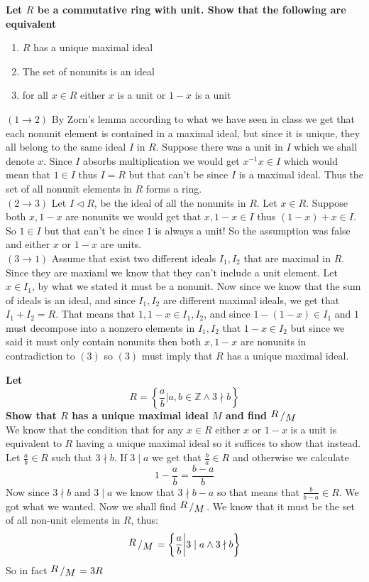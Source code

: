 \documentclass{article}
\theoremstyle{plain}
\DeclareMathOperator{\idealin}{\triangleleft}
\newcommand{\Z}{\mathbb{Z}}
\newcommand{\bigslant}[2]
{{\raisebox{.2em}{$#1$}\left/\raisebox{-.2em}{$#2$}\right.}}
\begin{document}
	\textbf{Let $R$ be a commutative ring with unit. Show that the following 
	are equivalent}
    \begin{enumerate}
        \item $R$ has a unique maximal ideal
        \item The set of nonunits is an ideal
        \item for all $x\in R$ either $x$ is a unit or $1-x$ is a 
        unit
    \end{enumerate}
    $(1\to 2)$ By Zorn's lemma according to what we have seen in
    class we get that each nonunit element is contained in a maximal
    ideal, but since it is unique, they all belong to the same ideal
    $I$ in $R$. Suppose there was a unit in $I$ which we shall
    denote $x$. Since $I$ absorbs multiplication we would get
    $x^{-1}x\in I$ which would mean that $1\in I$ thus $I=R$ but
    that can't be since $I$ is a maximal ideal. Thus the set of
    all nonunit elements in $R$ forms a ring. \\
    $(2\to 3)$ Let $I\idealin R$, be the ideal of all the nonunits
    in $R$. Let $x\in R$. Suppose both $x,1-x$ are nonunits
    we would get that $x,1-x\in I$ thus $(1-x)+x\in I$. So $1\in I$
    but that can't be since $1$ is always a unit! So the assumption
    was false and either $x$ or $1-x$ are units. \\
    $(3\to 1)$ Assume that exist two different ideals $I_1,I_2$
    that are maximal in $R$. Since they are maxiaml we know that
    they can't include a unit element. Let $x\in I_1$, by what
    we stated it must be a nonunit. Now since we know that the sum
    of ideals is an ideal, and since $I_1,I_2$ are different 
    maximal ideals, we get that $I_1+I_2=R$. That means that
    $1,1-x\in I_1,I_2$, and since $1-(1-x)\in I_1$ and $1$ must
    decompose into a nonzero elements in $I_1,I_2$ that $1-x\in I_2$
    but since we said it must only contain nonunits then both
    $x,1-x$ are nonunits in contradiction to $(3)$ so $(3)$
    must imply that $R$ has a unique maximal ideal.

	\newpage

    \textbf{Let
    \[
    R = \left\{\frac{a}{b} \biggr\vert a,b\in\Z \land 3\nmid b \right\}
    \] Show that $R$ has a unique maximal ideal $M$ and find 
    $\bigslant{R}{M}$} \\
    We know that the condition that for any $x\in R$ either
    $x$ or $1-x$ is a unit is equivalent to $R$ having a unique
    maximal ideal so it suffices to show that instead.
    Let $\frac ab\in R$ such that $3\nmid b$. If $3\mid a$ we
    get that $\frac ba\in R$ and otherwise we calculate
    \[
    1-\frac ab = \frac{b-a}{b}
    \]
    Now since $3\nmid b$ and $3\mid a$ we know that $3\nmid b-a$
    so that means that $\frac{b}{b-a}\in R$. We got what we wanted.
    Now we shall find $\bigslant{R}{M}$. We know that it must be the
    set of all non-unit elements in $R$, thus:
    \[
    	\bigslant{R}{M} = 
    	\left\{\frac ab \biggr\vert 3\mid a \land 3\nmid b \right\}
    \]
    So in fact $\bigslant{R}{M} = 3R$
\end{document}
